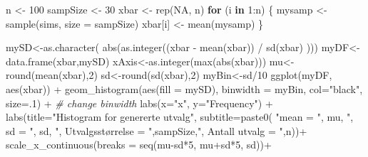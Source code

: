 \documentclass[
]{book}
\newenvironment{Shaded}{\begin{snugshade}}{\end{snugshade}}
\newcommand{\AttributeTok}[1]{\textcolor[rgb]{0.77,0.63,0.00}{#1}}
\newcommand{\CommentTok}[1]{\textcolor[rgb]{0.56,0.35,0.01}{\textit{#1}}}
\newcommand{\ConstantTok}[1]{\textcolor[rgb]{0.00,0.00,0.00}{#1}}
\newcommand{\ControlFlowTok}[1]{\textcolor[rgb]{0.13,0.29,0.53}{\textbf{#1}}}
\newcommand{\DecValTok}[1]{\textcolor[rgb]{0.00,0.00,0.81}{#1}}
\newcommand{\FunctionTok}[1]{\textcolor[rgb]{0.00,0.00,0.00}{#1}}
\newcommand{\NormalTok}[1]{#1}
\newcommand{\OtherTok}[1]{\textcolor[rgb]{0.56,0.35,0.01}{#1}}
\newcommand{\SpecialCharTok}[1]{\textcolor[rgb]{0.00,0.00,0.00}{#1}}
\newcommand{\StringTok}[1]{\textcolor[rgb]{0.31,0.60,0.02}{#1}}
\begin{document}
\begin{Shaded}
\begin{Highlighting}[]
\NormalTok{n }\OtherTok{\textless{}{-}} \DecValTok{100}
\NormalTok{sampSize }\OtherTok{\textless{}{-}} \DecValTok{30}
\NormalTok{xbar }\OtherTok{\textless{}{-}} \FunctionTok{rep}\NormalTok{(}\ConstantTok{NA}\NormalTok{, n)}
\ControlFlowTok{for}\NormalTok{ (i }\ControlFlowTok{in} \DecValTok{1}\SpecialCharTok{:}\NormalTok{n) \{}
\NormalTok{  mysamp }\OtherTok{\textless{}{-}} \FunctionTok{sample}\NormalTok{(sims, }\AttributeTok{size =}\NormalTok{ sampSize)}
\NormalTok{  xbar[i] }\OtherTok{\textless{}{-}} \FunctionTok{mean}\NormalTok{(mysamp)}
\NormalTok{\}}

\NormalTok{mySD}\OtherTok{\textless{}{-}}\FunctionTok{as.character}\NormalTok{( }\FunctionTok{abs}\NormalTok{(}\FunctionTok{as.integer}\NormalTok{((xbar }\SpecialCharTok{{-}} \FunctionTok{mean}\NormalTok{(xbar)) }\SpecialCharTok{/} \FunctionTok{sd}\NormalTok{(xbar) )))}
\NormalTok{myDF}\OtherTok{\textless{}{-}}\FunctionTok{data.frame}\NormalTok{(xbar,mySD)}
\NormalTok{xAxis}\OtherTok{\textless{}{-}}\FunctionTok{as.integer}\NormalTok{(}\FunctionTok{max}\NormalTok{(}\FunctionTok{abs}\NormalTok{(xbar)))}
\NormalTok{mu}\OtherTok{\textless{}{-}}\FunctionTok{round}\NormalTok{(}\FunctionTok{mean}\NormalTok{(xbar),}\DecValTok{2}\NormalTok{)}
\NormalTok{sd}\OtherTok{\textless{}{-}}\FunctionTok{round}\NormalTok{(}\FunctionTok{sd}\NormalTok{(xbar),}\DecValTok{2}\NormalTok{)}
\NormalTok{myBin}\OtherTok{\textless{}{-}}\NormalTok{sd}\SpecialCharTok{/}\DecValTok{10}
\FunctionTok{ggplot}\NormalTok{(myDF, }\FunctionTok{aes}\NormalTok{(xbar)) }\SpecialCharTok{+}
  \FunctionTok{geom\_histogram}\NormalTok{(}\FunctionTok{aes}\NormalTok{(}\AttributeTok{fill =}\NormalTok{ mySD), }\AttributeTok{binwidth =}\NormalTok{ myBin, }\AttributeTok{col=}\StringTok{"black"}\NormalTok{, }\AttributeTok{size=}\NormalTok{.}\DecValTok{1}\NormalTok{) }\SpecialCharTok{+}  \CommentTok{\# change binwidth}
  \FunctionTok{labs}\NormalTok{(}\AttributeTok{x=}\StringTok{"x"}\NormalTok{, }\AttributeTok{y=}\StringTok{"Frequency"}\NormalTok{) }\SpecialCharTok{+} 
  \FunctionTok{labs}\NormalTok{(}\AttributeTok{title=}\StringTok{"Histogram for genererte utvalg"}\NormalTok{,}
  \AttributeTok{subtitle=}\FunctionTok{paste0}\NormalTok{(  }\StringTok{"mean = "}\NormalTok{, mu, }\StringTok{", sd = "}\NormalTok{, sd, }\StringTok{", Utvalgsstørrelse = "}\NormalTok{,sampSize,}\StringTok{", Antall utvalg = "}\NormalTok{,n))}\SpecialCharTok{+}
  \FunctionTok{scale\_x\_continuous}\NormalTok{(}\AttributeTok{breaks =} \FunctionTok{seq}\NormalTok{(mu}\SpecialCharTok{{-}}\NormalTok{sd}\SpecialCharTok{*}\DecValTok{5}\NormalTok{, mu}\SpecialCharTok{+}\NormalTok{sd}\SpecialCharTok{*}\DecValTok{5}\NormalTok{, sd))}\SpecialCharTok{+}

\end{Highlighting}
\end{Shaded}
\end{document}
